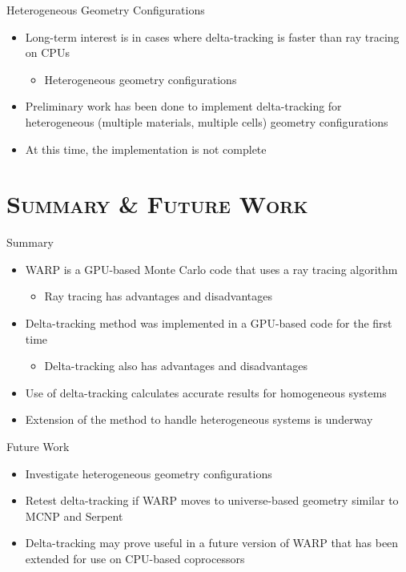 \documentclass[xcolor=x11names, compress, handout]{beamer}
\renewcommand{\(}{\begin{columns}}
\renewcommand{\)}{\end{columns}}
\newcommand{\<}[1]{\begin{column}{#1}}
\renewcommand{\>}{\end{column}}
\begin{document}
\begin{frame}{Heterogeneous Geometry Configurations}
	\begin{itemize}
	\item{Long-term interest is in cases where delta-tracking is faster than ray tracing on CPUs}
		\begin{itemize}
		\pause
		\item{Heterogeneous geometry configurations \cite{serpent}}
		\end{itemize}
	\pause
	\item{Preliminary work has been done to implement delta-tracking for heterogeneous (multiple 
	materials, multiple cells) geometry configurations}
	\pause
	\item{At this time, the implementation is not complete}
	\end{itemize}
\end{frame}


\section{\scshape Summary \& Future Work}
\begin{frame}{Summary}
	\begin{itemize}
	\item{WARP is a GPU-based Monte Carlo code that uses a ray tracing algorithm}
		\begin{itemize}
		\pause
		\item{Ray tracing has advantages and disadvantages}
		\end{itemize}
	\pause
	\item{Delta-tracking method was implemented in a GPU-based code for the first time}
		\begin{itemize}
		\pause
		\item{Delta-tracking also has advantages and disadvantages}
		\end{itemize}
	\pause
	\item{Use of delta-tracking calculates accurate results for homogeneous systems}
	\pause
	\item{Extension of the method to handle heterogeneous systems is underway}
	\end{itemize}
\end{frame}


\begin{frame}{Future Work}
	\begin{itemize}
	\item{Investigate heterogeneous geometry configurations}
	\pause
	\item{Retest delta-tracking if WARP moves to universe-based geometry similar to MCNP and Serpent}
	\pause
	\item{Delta-tracking may prove useful in a future version of WARP that has been extended for use 
	on CPU-based coprocessors}
	\end{itemize}
\end{frame}
\end{document}
